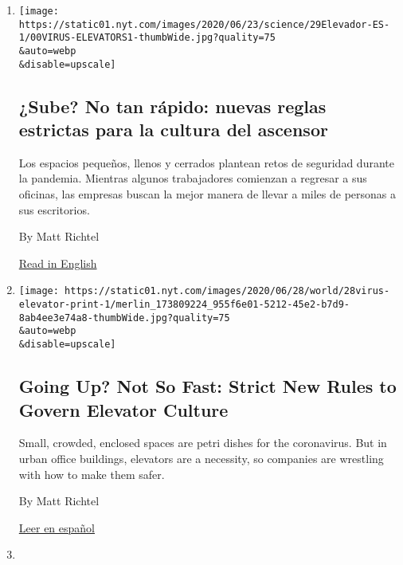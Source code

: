 \begin{enumerate}
\def\labelenumi{\arabic{enumi}.}
\item
  \href{/es/2020/06/29/espanol/ciencia-y-tecnologia/coronavirus-ascensor-contagio.html}{}

  \texttt{[image: https://static01.nyt.com/images/2020/06/23/science/29Elevador-ES-1/00VIRUS-ELEVATORS1-thumbWide.jpg?quality=75\\\&auto=webp\\\&disable=upscale]}

  \hypertarget{sube-no-tan-ruxe1pido-nuevas-reglas-estrictas-para-la-cultura-del-ascensor}{%
  \subsection{¿Sube? No tan rápido: nuevas reglas estrictas para la
  cultura del
  ascensor}\label{sube-no-tan-ruxe1pido-nuevas-reglas-estrictas-para-la-cultura-del-ascensor}}

  Los espacios pequeños, llenos y cerrados plantean retos de seguridad
  durante la pandemia. Mientras algunos trabajadores comienzan a
  regresar a sus oficinas, las empresas buscan la mejor manera de llevar
  a miles de personas a sus escritorios.

  By Matt Richtel

  \href{https://www.nytimes.com/2020/06/26/health/coronavirus-elevator-reopen.html}{Read
  in English}
\item
  \href{/2020/06/26/health/coronavirus-elevator-reopen.html}{}

  \texttt{[image: https://static01.nyt.com/images/2020/06/28/world/28virus-elevator-print-1/merlin\_173809224\_955f6e01-5212-45e2-b7d9-8ab4ee3e74a8-thumbWide.jpg?quality=75\\\&auto=webp\\\&disable=upscale]}

  \hypertarget{going-up-not-so-fast-strict-new-rules-to-govern-elevator-culture}{%
  \subsection{Going Up? Not So Fast: Strict New Rules to Govern Elevator
  Culture}\label{going-up-not-so-fast-strict-new-rules-to-govern-elevator-culture}}

  Small, crowded, enclosed spaces are petri dishes for the coronavirus.
  But in urban office buildings, elevators are a necessity, so companies
  are wrestling with how to make them safer.

  By Matt Richtel

  \href{https://www.nytimes.com/es/2020/06/29/espanol/ciencia-y-tecnologia/coronavirus-ascensor-contagio.html}{Leer
  en español}
\item
  \href{/2020/06/04/health/coronavirus-hunger-unemployment.html}{}


\end{enumerate}

